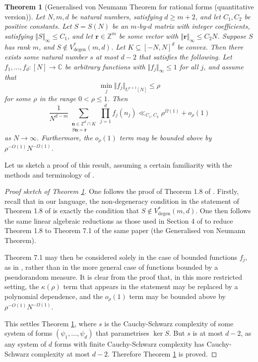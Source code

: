 \documentclass[12pt,a4paper,twoside,reqno]{amsart}
\newtheorem{Theorem}{Theorem}
\newcommand{\degen}{\operatorname{degen}}
\numberwithin{equation}{section}
\begin{document}
\begin{Theorem}[Generalised von Neumann Theorem for rational forms (quantitative version)]
\label{Linear equations in bounded functions}
Let $N,m,d$ be natural numbers, satisfying $d\geqslant m+2$, and let $C_1,C_2$ be positive constants. Let $S = S(N)$ be an $m$-by-$d$ matrix with integer coefficients, satisfying $\Vert S\Vert_\infty \leqslant C_1$, and let $\mathbf{r}\in \mathbb{Z}^m$ be some vector with $\Vert \mathbf{r} \Vert_\infty \leqslant C_2N$. Suppose $S$ has rank $m$, and $S\notin V^*_{\degen}(m,d)$. Let $K\subseteq [-N,N]^d$ be convex. Then there exists some natural number $s$ at most $d-2$ that satisfies the following. Let $f_1,\dots,f_d:[N]\longrightarrow \mathbb{C}$ be arbitrary functions with $\Vert f_j\Vert_\infty \leqslant 1$ for all $j$, and assume that \[ \min_j \Vert f_j\Vert_{U^{s+1}[N]} \leqslant \rho \] for some $\rho$ in the range $0<\rho \leqslant 1$. Then $$\frac{1}{N^{d-m}}\sum\limits_{\substack{\mathbf{n}\in \mathbb{Z}^d \cap K\\ S\mathbf{n} = \mathbf{r}}} \prod\limits_{j=1}^d f_j(n_j) \ll_{C_1,C_2}  \rho^{\Omega(1)} + o_\rho(1) $$ as $N\rightarrow \infty$. Furthermore, the $o_{\rho}(1)$ term may be bounded above by $\rho^{-O(1)} N^{-\Omega(1)}$. 
\end{Theorem}
Let us sketch a proof of this result, assuming a certain familiarity with the methods and terminology of \cite{GT10}.
\begin{proof}[Proof sketch of Theorem \ref{Linear equations in bounded functions}]
One follows the proof of Theorem 1.8 of \cite{GT10}. Firstly, recall that in our language, the non-degeneracy condition in the statement of Theorem 1.8 of \cite{GT10} is exactly the condition that $S\notin V^*_{\degen}(m,d)$. One then follows the same linear algebraic reductions as those used in Section 4 of \cite{GT10} to reduce Theorem 1.8 to Theorem 7.1 of the same paper (the Generalised von Neumann Theorem). 

Theorem 7.1 may then be considered solely in the case of bounded functions $f_j$, as in \cite[Exercise 1.3.23]{Ta12}, rather than in the more general case of functions bounded by a pseudorandom measure. It is clear from the proof that, in this more restricted setting, the $\kappa(\rho)$ term that appears in the statement may be replaced by a polynomial dependence, and the $o_{\rho}(1)$ term may be bounded above by $\rho^{-O(1)}N^{-\Omega(1)}$.   

This settles Theorem \ref{Linear equations in bounded functions}, where $s$ is the Cauchy-Schwarz complexity of some system of forms $(\psi_1,\dots,\psi_d)$ that parametrises $\ker S$. But $s$ is at most $d-2$, as any system of $d$ forms with finite Cauchy-Schwarz complexity has Cauchy-Schwarz complexity at most $d-2$. Therefore Theorem \ref{Linear equations in bounded functions} is proved. 
\end{proof}
\end{document}
